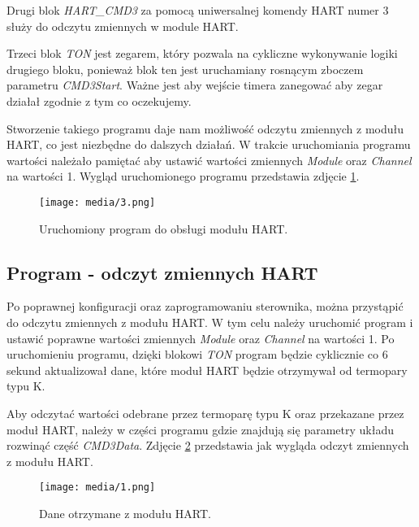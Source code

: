 \documentclass{article}
\begin{document}
Drugi blok \textit{HART\_CMD3} za pomocą uniwersalnej komendy HART numer 3 służy do odczytu zmiennych w module HART.

Trzeci blok \textit{TON} jest zegarem, który pozwala na cykliczne wykonywanie logiki drugiego bloku, ponieważ blok ten jest uruchamiany rosnącym zboczem parametru \textit{CMD3Start}. Ważne jest aby wejście timera zanegować aby zegar działał zgodnie z tym co oczekujemy.
\newpage

Stworzenie takiego programu daje nam możliwość odczytu zmiennych z modułu HART, co jest niezbędne do dalszych działań. W trakcie uruchomiania programu wartości należało pamiętać aby ustawić wartości zmiennych \textit{Module} oraz \textit{Channel} na wartości 1. Wygląd uruchomionego programu przedstawia zdjęcie \ref{fig3}.

\vspace{1em}
\begin{figure}[ht]
    \centering
    \texttt{[image: media/3.png]}
    \caption{Uruchomiony program do obsługi modułu HART.}
    \label{fig3}
\end{figure}

\newpage
\subsection{Program - odczyt zmiennych HART}
Po poprawnej konfiguracji oraz zaprogramowaniu sterownika, można przystąpić do odczytu zmiennych z modułu HART. W tym celu należy uruchomić program i ustawić poprawne wartości zmiennych \textit{Module} oraz \textit{Channel} na wartości 1. Po uruchomieniu programu, dzięki blokowi \textit{TON} program będzie cyklicznie co 6 sekund aktualizował dane, które moduł HART będzie otrzymywał od termopary typu K.

Aby odczytać wartości odebrane przez termoparę typu K oraz przekazane przez moduł HART, należy w części programu gdzie znajdują się parametry układu rozwinąć część \textit{CMD3Data}. Zdjęcie \ref{fig4} przedstawia jak wygląda odczyt zmiennych z modułu HART.


\vspace{1em}
\begin{figure}[ht]
    \centering
    \texttt{[image: media/1.png]}
    \caption{Dane otrzymane z modułu HART.}
    \label{fig4}
\end{figure}

\newpage
\end{document}
